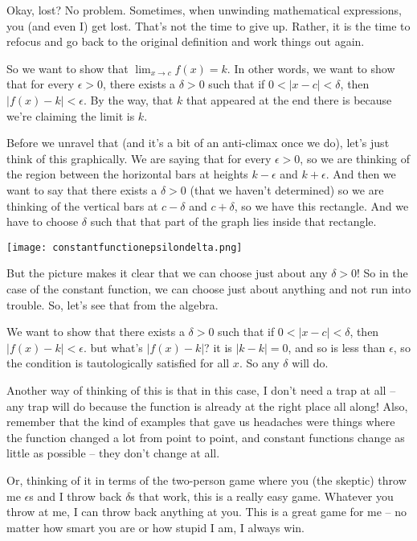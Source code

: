 \documentclass[10pt]{amsart}
\begin{document}
Okay, lost? No problem. Sometimes, when unwinding mathematical
expressions, you (and even I) get lost. That's not the time to give
up. Rather, it is the time to refocus and go back to the original
definition and work things out again.

So we want to show that $\lim_{x \to c} f(x) = k$. In other words, we
want to show that for every $\epsilon > 0$, there exists a $\delta >
0$ such that if $0 < |x - c| < \delta$, then $|f(x) - k| <
\epsilon$. By the way, that $k$ that appeared at the end there is
because we're claiming the limit is $k$.

Before we unravel that (and it's a bit of an anti-climax once we
do), let's just think of this graphically. We are saying that for
every $\epsilon > 0$, so we are thinking of the region between the
horizontal bars at heights $k - \epsilon$ and $k + \epsilon$. And then
we want to say that there exists a $\delta > 0$ (that we haven't
determined) so we are thinking of the vertical bars at $c - \delta$
and $c + \delta$, so we have this rectangle. And we have to choose
$\delta$ such that that part of the graph lies inside that rectangle.

\texttt{[image: constantfunctionepsilondelta.png]}

But the picture makes it clear that we can choose just about any
$\delta > 0$! So in the case of the constant function, we can choose
just about anything and not run into trouble. So, let's see that from the algebra.

We want to show that there exists a $\delta > 0$ such that if $0 <
|x - c| < \delta$, then $|f(x) - k| < \epsilon$. but what's $|f(x) -
k|$? it is $|k - k| = 0$, and so is less than $\epsilon$, so the
condition is tautologically satisfied for all $x$. So any $\delta$
will do.

Another way of thinking of this is that in this case, I don't need a
trap at all -- any trap will do because the function is already at the
right place all along! Also, remember that the kind of examples that
gave us headaches were things where the function changed a lot from
point to point, and constant functions change as little as possible --
they don't change at all.

Or, thinking of it in terms of the two-person game where you (the
skeptic) throw me $\epsilon$s and I throw back $\delta$s that work,
this is a really easy game. Whatever you throw at me, I can throw back
anything at you. This is a great game for me -- no matter how smart
you are or how stupid I am, I always win.
\end{document}
